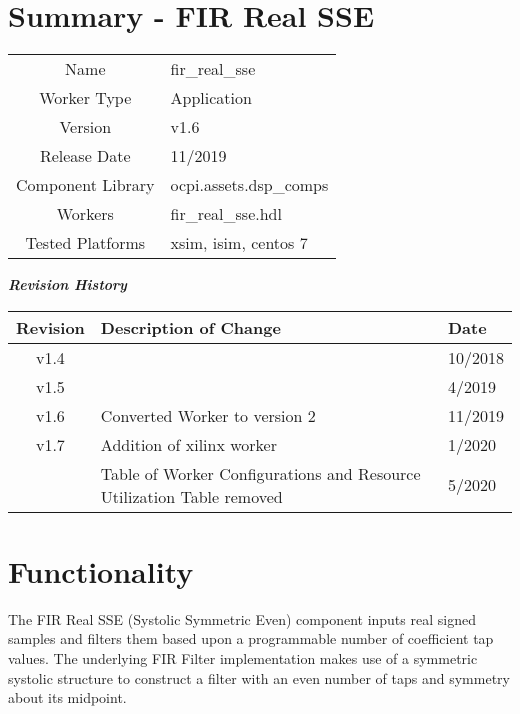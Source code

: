 \documentclass{article}
\author{} %
\date{Version \docVersion} %
\title{\docTitle}
\def\docVersion{1.6}
\def\comp{fir\_real\_sse}
\def\Comp{FIR Real SSE}
\begin{document}
\section*{Summary - \Comp}

\begin{tabular}{|c|M{13.5cm}|}
	\hline
	                  &                                                              \\
	\hline
	Name              & \comp                                                        \\
	\hline
	Worker Type       & Application                                                  \\
	\hline
	Version           & v\docVersion \\
	\hline
	Release Date      & 11/2019 \\
	\hline
	Component Library & ocpi.assets.dsp\_comps                                        \\
	\hline
	Workers           & \comp.hdl                                                    \\
	\hline
	Tested Platforms  & xsim, isim, centos 7 \\
	\hline
\end{tabular}


\begin{center}
	\textit{\textbf{Revision History}}
		\begin{table}[H]
		\label{table:revisions} %
			\begin{tabularx}{\textwidth}{|c|X|l|}
			\hline
			\rowcolor{blue}
			\textbf{Revision} & \textbf{Description of Change} & \textbf{Date} \\
		    \hline
		    v1.4 & & 10/2018 \\
		    \hline
       	 	v1.5 &  & 4/2019 \\
		    \hline
		     v1.6 & Converted Worker to version 2 & 11/2019 \\
		    \hline
        		v1.7 & Addition of xilinx worker & 1/2020 \\
        		    & Table of Worker Configurations and Resource Utilization Table removed & 5/2020 \\
              \hline
			\end{tabularx}
		\end{table}
	\end{center}

\section*{Functionality}
\begin{flushleft}
	The FIR Real SSE (Systolic Symmetric Even) component inputs real signed samples and filters them based upon a programmable number of coefficient tap values. The underlying FIR Filter implementation makes use of a symmetric systolic structure to construct a filter with an even number of taps and symmetry about its midpoint.
\end{flushleft}
\end{document}
